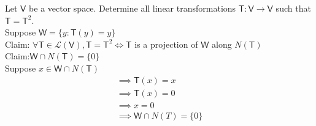 Let $\mathsf{V}$ be a vector space. Determine all linear
transformations $\mathsf{T}\colon \mathsf{V}\to\mathsf{V}$ such that
$\mathsf{T}=\mathsf{T}^2$.
\\Suppose $\mathsf{W} = \{y\colon \mathsf{T}(y) = y\}$
\\Claim: $\forall\mathsf{T}\in \mathcal{L}(\mathsf{V}), \mathsf{T}=\mathsf{T}^2 \Leftrightarrow \mathsf{T}$ is a projection of $\mathsf{W}$ along $N(\mathsf{T})$
\\Claim:$\mathsf{W}\cap N(\mathsf{T}) =\{0\}$
\\Suppose $x\in \mathsf{W}\cap N(\mathsf{T})$
\begin{gather}
\implies \mathsf{T}(x) = x \\
\implies \mathsf{T}(x) = 0\\
\implies x = 0\\
\implies \mathsf{W} \cap N(T) = \{0\}
\end{gather}

